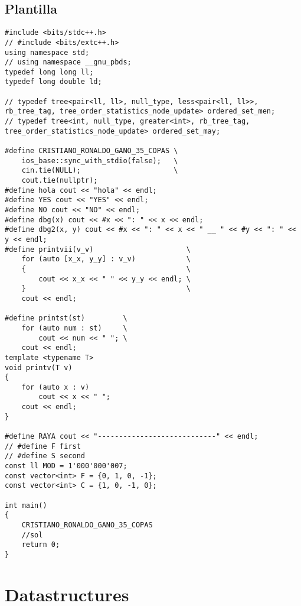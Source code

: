 \subsection*{Plantilla}
\begin{lstlisting}
#include <bits/stdc++.h>
// #include <bits/extc++.h>
using namespace std;
// using namespace __gnu_pbds;
typedef long long ll;
typedef long double ld;

// typedef tree<pair<ll, ll>, null_type, less<pair<ll, ll>>, rb_tree_tag, tree_order_statistics_node_update> ordered_set_men;
// typedef tree<int, null_type, greater<int>, rb_tree_tag, tree_order_statistics_node_update> ordered_set_may;

#define CRISTIANO_RONALDO_GANO_35_COPAS \
    ios_base::sync_with_stdio(false);   \
    cin.tie(NULL);                      \
    cout.tie(nullptr);
#define hola cout << "hola" << endl;
#define YES cout << "YES" << endl;
#define NO cout << "NO" << endl;
#define dbg(x) cout << #x << ": " << x << endl;
#define dbg2(x, y) cout << #x << ": " << x << " __ " << #y << ": " << y << endl;
#define printvii(v_v)                      \
    for (auto [x_x, y_y] : v_v)            \
    {                                      \
        cout << x_x << " " << y_y << endl; \
    }                                      \
    cout << endl;

#define printst(st)         \
    for (auto num : st)     \
        cout << num << " "; \
    cout << endl;
template <typename T>
void printv(T v)
{
    for (auto x : v)
        cout << x << " ";
    cout << endl;
}

#define RAYA cout << "----------------------------" << endl;
// #define F first
// #define S second
const ll MOD = 1'000'000'007;
const vector<int> F = {0, 1, 0, -1};
const vector<int> C = {1, 0, -1, 0};

int main()
{
    CRISTIANO_RONALDO_GANO_35_COPAS
    //sol
    return 0;
}\end{lstlisting}

\section*{Datastructures}

